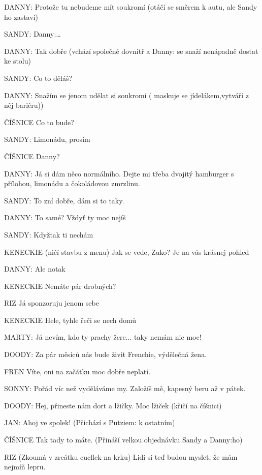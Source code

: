 \rep DANNY:        Protože tu nebudeme mít soukromí (otáčí se směrem k autu, ale Sandy         ho zastaví) 

\rep SANDY:        \rep Danny:… 

\rep DANNY:         Tak dobře (vchází společně dovnitř a \rep Danny: se snaží nenápadně dostat         ke stolu) 

\rep SANDY:         Co to děláš? 

\rep DANNY:         Snažím se jenom udělat si soukromí ( maskuje se jídelákem,vytváří z něj bariéru))

ČÍŠNICE         Co to bude? 

\rep SANDY:        Limonádu, prosím 

ČÍŠNICE         Danny? 

\rep DANNY:        Já si dám něco normálního. Dejte mi třeba dvojitý hamburger s přílohou,         limonádu a čokoládovou zmrzlinu. 

\rep SANDY:        To zní dobře, dám si to taky. 

\rep DANNY:         To samé? Vždyť ty moc nejíš 

\rep SANDY:         Kdyžtak ti nechám 

KENECKIE        (ničí stavbu z menu) Jak se vede, Zuko? Je na vás krásnej pohled 

\rep DANNY:         Ale notak

KENECKIE        Nemáte pár drobných?

RIZ                Já sponzoruju jenom sebe 

KENECKIE        Hele, tyhle řeči se nech domů 

\rep MARTY:        Já nevím, kdo ty prachy žere... taky nemám nic moc! 

\rep DOODY:        Za pár měsíců nás bude živit Frenchie, výdělečná žena. 

FREN        Víte, oni na začátku moc dobře neplatí. 

\rep SONNY:        Pořád víc než vyděláváme my. Založíš mě, kapesný beru až v pátek. 

\rep DOODY:         Hej, přineste nám dort a  lžičky.  Moc lžiček (křičí na číšnici) 

\rep JAN:         Ahoj ve spolek! (Přichází s \rep Putziem: k ostatním) 

ČÍŠNICE        Tak tady to máte. (Přináší velkou objednávku Sandy a \rep Danny:ho) 

RIZ         (Zkoumá v zrcátku cucflek na krku) Lidi si teď budou myslet, že mám         nejmíň lepru. 

